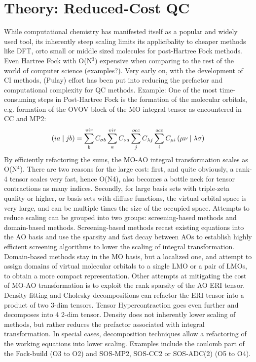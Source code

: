 \part{Theory: Reduced-Cost QC}

While computational chemistry has manifested itself as a popular and widely used tool, its inherently steep scaling limits its applicibality to cheaper methods like DFT, orto small or middle sized molecules for post-Hartree Fock methods. Even Hartree Fock with O(N$^3$) expensive when comparing to the rest of the world of computer science (examples?). Very early on, with the development of CI methods, (Pulay) effort has been put into reducing the prefactor and computational complexity for QC methods. Example: One of the most time-consuming steps in Post-Hartree Fock is the formation of the molecular orbitals, e.g. formation of the OVOV block of the MO integral tensor as encountered in CC and MP2:
\begin{equation}
\left( ia \mid jb \right) = \sum^{vir}_b C_{\sigma b} \sum^{vir}_a C_{\nu a} \sum^{occ}_j C_{\lambda j} \sum^{occ}_i C_{\mu i} \left( \mu\nu \mid \lambda\sigma \right)
\end{equation}
By efficiently refactoring the sums, the MO-AO integral transformation scales as O(N$^4$). There are two reasons for the large cost: first, and quite obviously, a rank-4 tensor scales very fast, hence O(N4), also becomes a bottle neck for tensor contractions as many indices. Secondly, for large basis sets with triple-zeta quality or higher, or basis sets with diffuse functions, the virtual orbital space is very large, and can be multiple times the size of the occupied space. 
Attempts to reduce scaling can be grouped into two groups: screening-based methods and domain-based methods. Screening-based methods recast existing equations into the AO basis and use the sparsity and fast decay between AOs to establish highly efficient screening algorithms to lower the scaling of integral transformation. Domain-based methods stay in the MO basis, but a localized one, and attempt to assign domains of virtual molecular orbitals to a single LMO or a pair of LMOs, to obtain a more compact representation. 
Other attempts at mitigating the cost of MO-AO transformation is to exploit the rank sparsity of the AO ERI tensor. Density fitting and Cholesky decompositions can refactor the ERI tensor into a product of two 3-dim tensors. Tensor Hypercontraction goes even further and decomposes into 4 2-dim tensor. Density does not inherently lower scaling of methods, but rather reduces the prefactor associated with integral transformation. In special cases, decomposition techniques allow a refactoring of the working equations into lower scaling. Examples include the coulomb part of the Fock-build (O3 to O2) and SOS-MP2, SOS-CC2 or SOS-ADC(2) (O5 to O4).  
